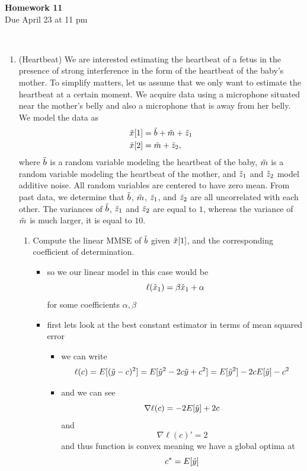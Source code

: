 \documentclass[12pt,twoside]{article}
\begin{document}
\begin{center}
{\large{\textbf{Homework 11}} } \vspace{0.2cm}\\
Due April 23 at 11 pm
\\
\end{center}
\\

\begin{enumerate}

 \item (Heartbeat) We are interested estimating the heartbeat of a fetus in the presence of strong interference in the form of the heartbeat of the baby's mother. To simplify matters, let us assume that we only want to estimate the heartbeat at a certain moment. We acquire data using a microphone situated near the mother's belly and also a microphone that is away from her belly. We model the data as
\begin{align}
\tilde{  x }[1] & = \tilde{  b } + \tilde{ m } + \tilde{ z }_1\\
\tilde{  x }[2] & = \tilde{ m } + \tilde{ z }_2,
\end{align}
where $\tilde{  b }$ is a random variable modeling the heartbeat of the baby, $\tilde{ m }$ is a random variable modeling the heartbeat of the mother, and $\tilde{ z }_1$ and $\tilde{ z }_2$ model additive noise. All random variables are centered to have zero mean. From past data, we determine that $\tilde{  b }$, $\tilde{ m }$, $\tilde{ z }_1$, and $\tilde{ z }_2$ are all uncorrelated with each other. The variances of $\tilde{  b }$, $\tilde{ z }_1$ and $\tilde{ z }_2$ are equal to $1$, whereas the variance of $\tilde{ m }$ is much larger, it is equal to $10$.
\begin{enumerate}
\item Compute the linear MMSE of $\tilde{  b }$ given $\tilde{  x }[1]$, and the corresponding coefficient of determination.  
\begin{itemize}
    \color{blue}
    \item so we our linear model in this case would be $$\ell(\Tilde{x}_1)=\beta \Tilde{x}_1 + \alpha$$ for some coefficients $\alpha, \beta$
    \item first lets look at the best constant estimator in terms of mean squared error 
    \begin{itemize}
        \item we can write $$\ell(c)=E[(\Tilde{y}- c)^2]=E[\Tilde{y}^2 - 2c\Tilde{y}+c^2]= E[\Tilde{y}^2] - 2cE[\Tilde{y}]-c^2$$
        \item and we can see $$\nabla \ell(c)=-2E[\Tilde{y}]+2c$$ and $$\nabla \ell(c)'=2$$ and thus function is convex meaning we have a global optima at $$c^{*}=E[\Tilde{y}]$$

\end{itemize}
\end{itemize}
\end{enumerate}
\end{enumerate}
\end{document}
